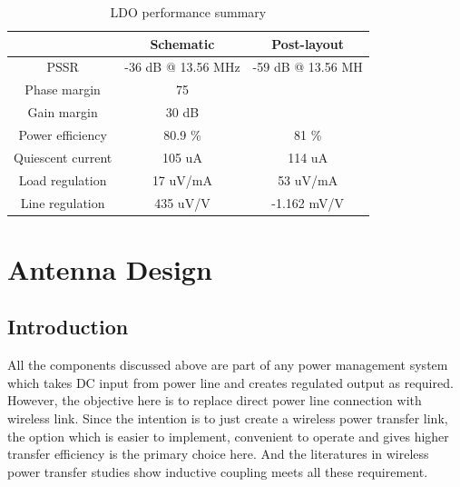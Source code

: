 \documentclass[12pt,a4paper,UKenglish]{report}
\begin{document}
\begin{table}[H]
\caption{LDO performance summary} 
\begin{center}
\begin{tabular}{c|c|c}
\hline \hline
				 & \textbf{Schematic}		& \textbf{Post-layout} \\
\hline \hline
PSSR 			 & -36 dB	@ 13.56 MHz	&-59 dB	@ 13.56 MH\\ \hline
Phase margin		 & 75\textdegree 		&	 \\ \hline
Gain margin		 & 30 dB				&	 \\ \hline
Power efficiency		& 80.9 \%			& 81 \%	\\ \hline
Quiescent current	& 105 uA			& 114 uA	\\ \hline
Load regulation 	& 17 uV/mA			& 53 uV/mA	\\ \hline
Line regulation 		&  435 uV/V 		& -1.162 mV/V	\\ 
\hline \hline
\end{tabular}
\end{center}
\label{tab:ldo_spec}
\end{table}%



\clearpage
\newpage




\chapter{Antenna Design}  

\section{Introduction}		%

All the components discussed above are part of any power management system which takes DC input from power line 
and creates regulated output as required. However, the objective here is to replace direct power line connection with 
wireless link. Since the intention is to just create a wireless power transfer link, the option which is easier to implement, 
convenient to operate and gives higher transfer efficiency is the primary choice here. And the literatures in wireless power 
transfer studies show inductive coupling meets all these requirement. \\
\end{document}
